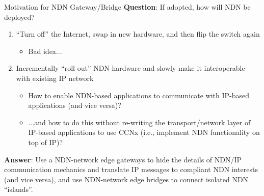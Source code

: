 \documentclass[handout]{beamer}
\begin{document}





\begin{frame}{Motivation for NDN Gateway/Bridge}
	\textbf{Question}: If adopted, how will NDN be deployed?
	\begin{enumerate}	
		\item ``Turn off'' the Internet, swap in new hardware, and then flip the switch again
		\begin{itemize}
			\item Bad idea...
		\end{itemize}
		\item Incrementally ``roll out'' NDN hardware and slowly make it interoperable with existing IP network
		\begin{itemize}
			\item How to enable NDN-based applications to communicate with IP-based applications (and vice versa)?
			\item ...and how to do this without re-writing the transport/network layer of IP-based applications to use CCNx (i.e., implement NDN functionality on top of IP)?
		\end{itemize}
	\end{enumerate}

	{\bf Answer}: Use a NDN-network edge gateways to hide the details of NDN/IP communication mechanics and translate IP messages to compliant NDN interests (and vice versa), and use NDN-network edge bridges to connect isolated NDN ``islands''.
\end{frame}
\end{document}
